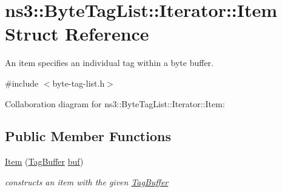 \hypertarget{structns3_1_1ByteTagList_1_1Iterator_1_1Item}{}\section{ns3\+:\+:Byte\+Tag\+List\+:\+:Iterator\+:\+:Item Struct Reference}
\label{structns3_1_1ByteTagList_1_1Iterator_1_1Item}


An item specifies an individual tag within a byte buffer.  




{\ttfamily \#include $<$byte-\/tag-\/list.\+h$>$}



Collaboration diagram for ns3\+:\+:Byte\+Tag\+List\+:\+:Iterator\+:\+:Item\+:
\subsection*{Public Member Functions}
\begin{DoxyCompactItemize}
\item 
\hyperlink{structns3_1_1ByteTagList_1_1Iterator_1_1Item_acbefc31279faa7437e5ee3c88a16d925}{Item} (\hyperlink{classns3_1_1TagBuffer}{Tag\+Buffer} \hyperlink{structns3_1_1ByteTagList_1_1Iterator_1_1Item_aafaf58854685aec641de85ebeef5be1d}{buf})
\begin{DoxyCompactList}\small\item\em constructs an item with the given \hyperlink{classns3_1_1TagBuffer}{Tag\+Buffer} \end{DoxyCompactList}\end{DoxyCompactItemize}
